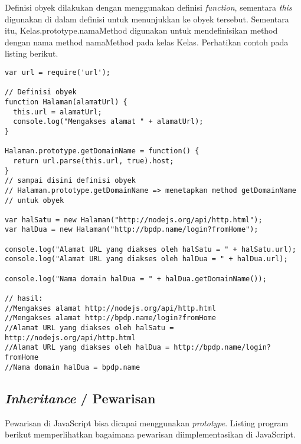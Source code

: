 Definisi obyek dilakukan dengan menggunakan definisi \textit{function}, sementara \textit{this} digunakan di dalam definisi untuk menunjukkan ke obyek tersebut. Sementara itu, Kelas.prototype.namaMethod digunakan untuk mendefinisikan method dengan nama method namaMethod pada kelas Kelas. Perhatikan contoh pada listing berikut.

\lstset{language=JavaScript,caption=Definisi obyek di JavaScript}
\begin{lstlisting}
var url = require('url');

// Definisi obyek
function Halaman(alamatUrl) {
  this.url = alamatUrl;
  console.log("Mengakses alamat " + alamatUrl);
}

Halaman.prototype.getDomainName = function() {
  return url.parse(this.url, true).host; 
}
// sampai disini definisi obyek
// Halaman.prototype.getDomainName => menetapkan method getDomainName
// untuk obyek

var halSatu = new Halaman("http://nodejs.org/api/http.html");
var halDua = new Halaman("http://bpdp.name/login?fromHome");

console.log("Alamat URL yang diakses oleh halSatu = " + halSatu.url);
console.log("Alamat URL yang diakses oleh halDua = " + halDua.url);

console.log("Nama domain halDua = " + halDua.getDomainName());

// hasil:
//Mengakses alamat http://nodejs.org/api/http.html
//Mengakses alamat http://bpdp.name/login?fromHome
//Alamat URL yang diakses oleh halSatu = http://nodejs.org/api/http.html
//Alamat URL yang diakses oleh halDua = http://bpdp.name/login?fromHome
//Nama domain halDua = bpdp.name
\end{lstlisting}

\subsection{\textit{Inheritance} / Pewarisan}

Pewarisan di JavaScript bisa dicapai menggunakan \textit{prototype}. Listing program berikut memperlihatkan bagaimana pewarisan diimplementasikan di JavaScript.

